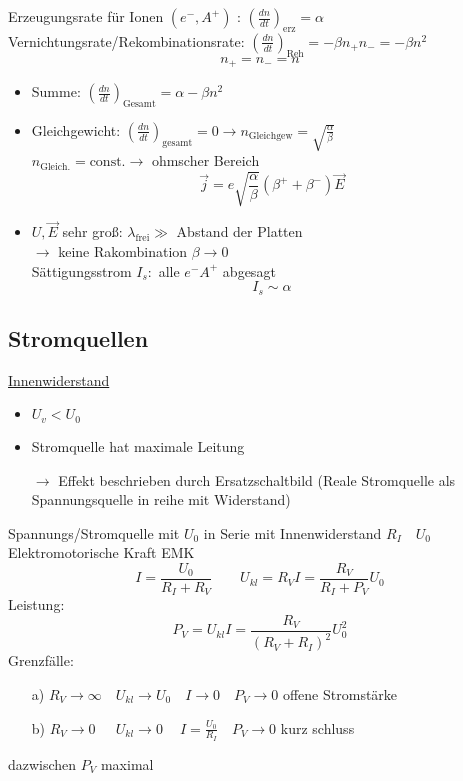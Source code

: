 \documentclass[titlepage,12pt,a4paper,ngerman]{report}
\newcommand{\tx}[1]{\textrm{#1}}
\begin{document}

\noindent
Erzeugungsrate für Ionen $ (e^-,A^+) $ : $ (\frac{dn}{dt})_{\tx{erz}} = \alpha $\\
Vernichtungsrate/Rekombinationsrate: $ (\frac{dn}{dt})_{\tx{Reh}}  = -\beta n_+ n_- = - \beta n^2$
$$ n_+ = n_- = n $$
\begin{itemize}
	\item Summe:  $ (\frac{dn}{dt}) _{\tx{Gesamt}} = \alpha - \beta n^2 $\\
	\item Gleichgewicht: $ (\frac{dn}{dt})_{\tx{gesamt}} = 0 \rightarrow n_{\tx{Gleichgew}} = \sqrt{\frac{\alpha}{\beta}} $\\
	$ n_{\tx{Gleich.}} = \tx{const.} \rightarrow $ ohmscher Bereich
	$$ \vec{j} = e \sqrt{\frac{\alpha}{\beta}} (\beta^+ + \beta^- ) \vec{E}$$
	\item $ U,\vec{E} $ sehr groß: $ \lambda_{\tx{frei}} \gg $ Abstand der Platten\\
	$ \rightarrow $ keine Rakombination $ \beta \rightarrow 0 $\\
	Sättigungsstrom $ I_s: $ alle $ e^- A^+ $ abgesagt
	$$ I_s \sim \alpha$$
\end{itemize}
\subsection{Stromquellen}
\underline{Innenwiderstand}
\begin{itemize}
	\item $ U_v < U_0 $
	\item Stromquelle hat maximale Leitung
	\item[$ \rightarrow $] Effekt beschrieben durch Ersatzschaltbild (Reale Stromquelle als Spannungsquelle in reihe mit Widerstand)
\end{itemize}
Spannungs/Stromquelle mit $ U_0 $ in Serie mit Innenwiderstand $ R_I \quad U_0 $ Elektromotorische Kraft EMK
$$I = \frac{U_0}{R_I+R_V} \qquad U_{kl} = R_V I = \frac{R_V}{R_I+P_V}U_0$$
Leistung: $$P_V = U_{kl} I = \frac{R_V}{(R_V+R_I)^2} U_0^2$$
Grenzfälle: \begin{itemize}
	\item [a)] $ R_V \rightarrow \infty \quad U_{kl} \rightarrow U_0 \quad I \rightarrow 0 \quad P_V \rightarrow 0 $ offene Stromstärke
	\item [b)] $R_V \rightarrow 0 \ \ \quad U_{kl} \rightarrow 0 \ \quad I = \frac{U_0}{R_I} \quad P_V \rightarrow0 $ kurz schluss
\end{itemize}
dazwischen $ P_V $ maximal
\end{document}
